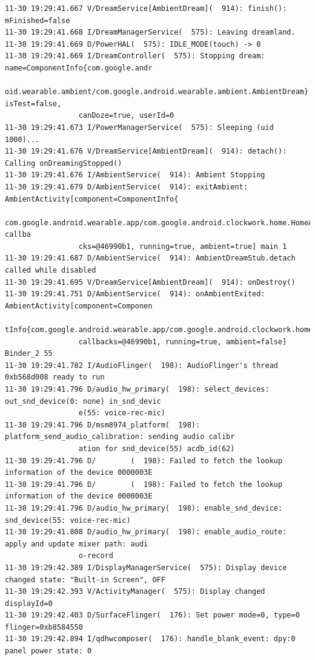 \documentclass[a4paper,11pt,dvips]{article}
\begin{document}
\scriptsize
\begin{verbatim}
11-30 19:29:41.667 V/DreamService[AmbientDream](  914): finish(): mFinished=false
11-30 19:29:41.668 I/DreamManagerService(  575): Leaving dreamland.
11-30 19:29:41.669 D/PowerHAL(  575): IDLE_MODE(touch) -> 0
11-30 19:29:41.669 I/DreamController(  575): Stopping dream: name=ComponentInfo{com.google.andr
                 oid.wearable.ambient/com.google.android.wearable.ambient.AmbientDream}, isTest=false,
                 canDoze=true, userId=0
11-30 19:29:41.673 I/PowerManagerService(  575): Sleeping (uid 1000)...
11-30 19:29:41.676 V/DreamService[AmbientDream](  914): detach(): Calling onDreamingStopped()
11-30 19:29:41.676 I/AmbientService(  914): Ambient Stopping
11-30 19:29:41.679 D/AmbientService(  914): exitAmbient: AmbientActivity[component=ComponentInfo{
                 com.google.android.wearable.app/com.google.android.clockwork.home.HomeActivity}, callba
                 cks=@46990b1, running=true, ambient=true] main 1
11-30 19:29:41.687 D/AmbientService(  914): AmbientDreamStub.detach called while disabled
11-30 19:29:41.695 V/DreamService[AmbientDream](  914): onDestroy()
11-30 19:29:41.751 D/AmbientService(  914): onAmbientExited: AmbientActivity[component=Componen
                 tInfo{com.google.android.wearable.app/com.google.android.clockwork.home.HomeActivity},
                 callbacks=@46990b1, running=true, ambient=false] Binder_2 55
11-30 19:29:41.782 I/AudioFlinger(  198): AudioFlinger's thread 0xb568d008 ready to run
11-30 19:29:41.796 D/audio_hw_primary(  198): select_devices: out_snd_device(0: none) in_snd_devic
                 e(55: voice-rec-mic)
11-30 19:29:41.796 D/msm8974_platform(  198): platform_send_audio_calibration: sending audio calibr
                 ation for snd_device(55) acdb_id(62)
11-30 19:29:41.796 D/        (  198): Failed to fetch the lookup information of the device 0000003E 
11-30 19:29:41.796 D/        (  198): Failed to fetch the lookup information of the device 0000003E 
11-30 19:29:41.796 D/audio_hw_primary(  198): enable_snd_device: snd_device(55: voice-rec-mic)
11-30 19:29:41.808 D/audio_hw_primary(  198): enable_audio_route: apply and update mixer path: audi
                 o-record
11-30 19:29:42.389 I/DisplayManagerService(  575): Display device changed state: "Built-in Screen", OFF
11-30 19:29:42.393 V/ActivityManager(  575): Display changed displayId=0
11-30 19:29:42.403 D/SurfaceFlinger(  176): Set power mode=0, type=0 flinger=0xb8584550
11-30 19:29:42.894 I/qdhwcomposer(  176): handle_blank_event: dpy:0 panel power state: 0

\end{verbatim}
\end{document}
